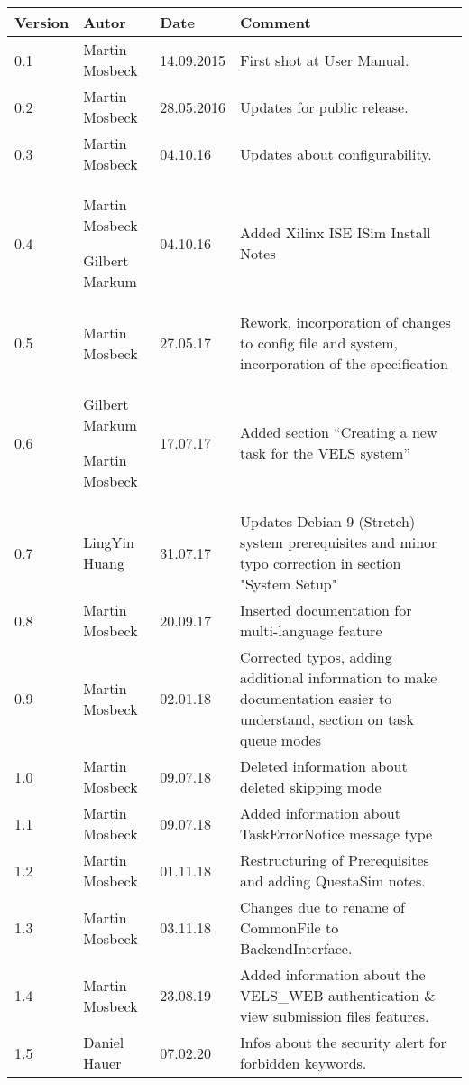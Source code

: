 
\begin{table}[h]
\begin{tabular*}{14.7cm}{|p{}|p{}|p{2cm}|p{}|}
\hline
Version & Autor & Date & Comment \\[2pt]
\hline
\hline
0.1 & Martin Mosbeck & 14.09.2015 & First shot at User Manual. \\[2pt]
\hline
0.2 & Martin Mosbeck & 28.05.2016 & Updates for public release. \\[2pt]
\hline
0.3 & Martin Mosbeck & 04.10.16 & Updates about configurability. \\[2pt]
\hline
0.4 & Martin Mosbeck \par Gilbert Markum & 04.10.16 & Added Xilinx ISE ISim Install Notes \\[2pt]
\hline
0.5 & Martin Mosbeck & 27.05.17 & Rework, incorporation of changes to config file and system, incorporation of the
specification \\[2pt]
\hline
0.6 & Gilbert Markum \par Martin Mosbeck & 17.07.17 & Added section ``Creating a new task for the VELS system'' \\[2pt]
\hline
0.7 & LingYin Huang & 31.07.17 & Updates Debian 9 (Stretch) system prerequisites and minor typo correction in section "System Setup" \\[2pt]
\hline
0.8 & Martin Mosbeck & 20.09.17 & Inserted documentation for multi-language feature \\[2pt]
\hline
0.9 & Martin Mosbeck & 02.01.18 & Corrected typos, adding additional information to make documentation easier to
understand, section on task queue modes  \\[2pt]
\hline
1.0 & Martin Mosbeck & 09.07.18 & Deleted information about deleted skipping mode \\[2pt]
\hline
1.1 & Martin Mosbeck & 09.07.18 & Added information about TaskErrorNotice message type\\[2pt]
\hline
1.2 & Martin Mosbeck & 01.11.18 & Restructuring of Prerequisites and adding QuestaSim notes.\\[2pt]
\hline
1.3 & Martin Mosbeck & 03.11.18 & Changes due to rename of CommonFile to BackendInterface.\\[2pt]
\hline
1.4 & Martin Mosbeck & 23.08.19 & Added information about the VELS\_WEB
authentication \& view submission files features.\\[2pt]
\hline
1.5 & Daniel Hauer & 07.02.20 &
Infos about the security alert for forbidden keywords.\\[2pt]
\hline
\end{tabular*}
\end{table}

